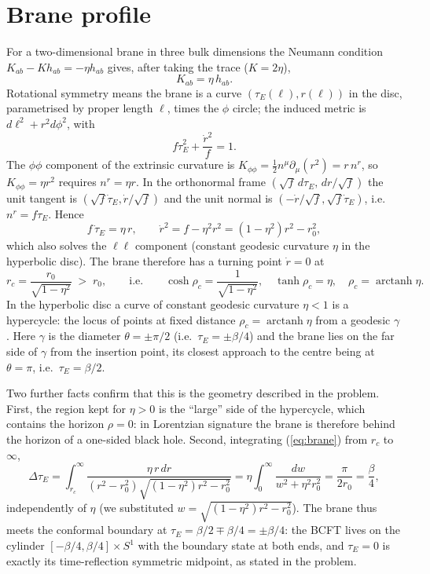 \documentclass[11pt]{article}
\newcommand{\arctanh}{\operatorname{arctanh}}
\begin{document}
\section{Brane profile}
For a two-dimensional brane in three bulk dimensions the Neumann condition $K_{ab}-Kh_{ab}=-\eta h_{ab}$ gives, after taking the trace ($K=2\eta$),
\begin{equation}
K_{ab}=\eta\,h_{ab}.
\end{equation}
Rotational symmetry means the brane is a curve $(\tau_E(\ell),r(\ell))$ in the disc, parametrised by proper length $\ell$, times the $\phi$ circle; the induced metric is $d\ell^2+r^2d\phi^2$, with
\begin{equation}
f\dot\tau_E^2+\frac{\dot r^2}{f}=1 .
\label{eq:norm}
\end{equation}
The $\phi\phi$ component of the extrinsic curvature is $K_{\phi\phi}=\frac12 n^\mu\partial_\mu(r^2)=r\,n^r$, so $K_{\phi\phi}=\eta r^2$ requires $n^r=\eta r$. In the orthonormal frame $(\sqrt f\,d\tau_E,\,dr/\sqrt f)$ the unit tangent is $(\sqrt f\dot\tau_E,\dot r/\sqrt f)$ and the unit normal is $(-\dot r/\sqrt f,\sqrt f\dot\tau_E)$, i.e.\ $n^r=f\dot\tau_E$. Hence
\begin{equation}
f\,\dot\tau_E=\eta\,r,\qquad \dot r^2=f-\eta^2r^2=(1-\eta^2)r^2-r_0^2 ,
\label{eq:brane}
\end{equation}
which also solves the $\ell\ell$ component (constant geodesic curvature $\eta$ in the hyperbolic disc). The brane therefore has a turning point $\dot r=0$ at
\begin{equation}
r_c=\frac{r_0}{\sqrt{1-\eta^2}}\;>\;r_0,\qquad\text{i.e.}\qquad \cosh\rho_c=\frac{1}{\sqrt{1-\eta^2}},\quad \tanh\rho_c=\eta,\quad \rho_c=\arctanh\eta .
\end{equation}
In the hyperbolic disc a curve of constant geodesic curvature $\eta<1$ is a hypercycle: the locus of points at fixed distance $\rho_c=\arctanh\eta$ from a geodesic $\gamma$. Here $\gamma$ is the diameter $\theta=\pm\pi/2$ (i.e.\ $\tau_E=\pm\beta/4$) and the brane lies on the far side of $\gamma$ from the insertion point, its closest approach to the centre being at $\theta=\pi$, i.e.\ $\tau_E=\beta/2$.

Two further facts confirm that this is the geometry described in the problem. First, the region kept for $\eta>0$ is the ``large'' side of the hypercycle, which contains the horizon $\rho=0$: in Lorentzian signature the brane is therefore behind the horizon of a one-sided black hole. Second, integrating (\ref{eq:brane}) from $r_c$ to $\infty$,
\begin{equation}
\Delta\tau_E=\int_{r_c}^\infty\frac{\eta\,r\,dr}{(r^2-r_0^2)\sqrt{(1-\eta^2)r^2-r_0^2}}
=\eta\int_0^\infty\frac{dw}{w^2+\eta^2r_0^2}=\frac{\pi}{2r_0}=\frac{\beta}{4},
\end{equation}
independently of $\eta$ (we substituted $w=\sqrt{(1-\eta^2)r^2-r_0^2}$). The brane thus meets the conformal boundary at $\tau_E=\beta/2\mp\beta/4=\pm\beta/4$: the BCFT lives on the cylinder $[-\beta/4,\beta/4]\times S^1$ with the boundary state at both ends, and $\tau_E=0$ is exactly its time-reflection symmetric midpoint, as stated in the problem.
\end{document}
